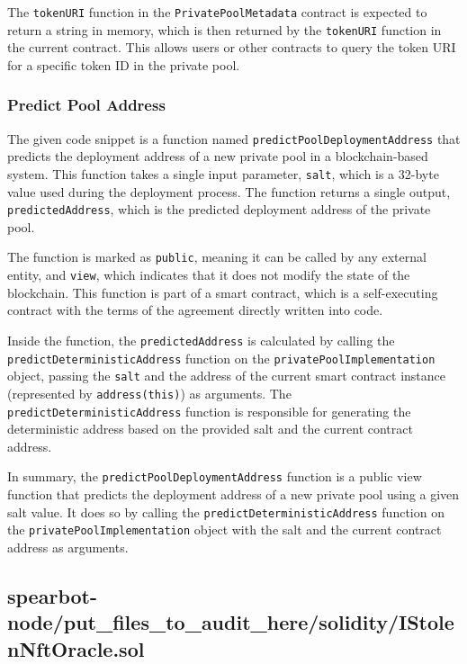 The \texttt{tokenURI} function in the \texttt{PrivatePoolMetadata}
contract is expected to return a string in memory, which is then
returned by the \texttt{tokenURI} function in the current contract. This
allows users or other contracts to query the token URI for a specific
token ID in the private pool.

\hypertarget{predict-pool-address}{%
\subsubsection{Predict Pool Address}\label{predict-pool-address}}

The given code snippet is a function named
\texttt{predictPoolDeploymentAddress} that predicts the deployment
address of a new private pool in a blockchain-based system. This
function takes a single input parameter, \texttt{salt}, which is a
32-byte value used during the deployment process. The function returns a
single output, \texttt{predictedAddress}, which is the predicted
deployment address of the private pool.

The function is marked as \texttt{public}, meaning it can be called by
any external entity, and \texttt{view}, which indicates that it does not
modify the state of the blockchain. This function is part of a smart
contract, which is a self-executing contract with the terms of the
agreement directly written into code.

Inside the function, the \texttt{predictedAddress} is calculated by
calling the \texttt{predictDeterministicAddress} function on the
\texttt{privatePoolImplementation} object, passing the \texttt{salt} and
the address of the current smart contract instance (represented by
\texttt{address(this)}) as arguments. The
\texttt{predictDeterministicAddress} function is responsible for
generating the deterministic address based on the provided salt and the
current contract address.

In summary, the \texttt{predictPoolDeploymentAddress} function is a
public view function that predicts the deployment address of a new
private pool using a given salt value. It does so by calling the
\texttt{predictDeterministicAddress} function on the
\texttt{privatePoolImplementation} object with the salt and the current
contract address as arguments.

\hypertarget{spearbot-nodeput_files_to_audit_heresolidityistolennftoraclesol}{%
\subsection{spearbot-node/put\_files\_to\_audit\_here/solidity/IStolenNftOracle.sol}\label{spearbot-nodeput_files_to_audit_heresolidityistolennftoraclesol}}

